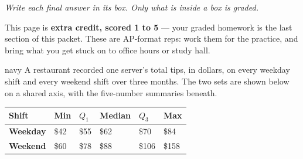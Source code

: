 \documentclass[12pt]{article}
\newcommand{\bxp}[7]{%
  \draw[thick, navy] (#3,#1) -- (#4,#1);
  \draw[thick, navy] (#6,#1) -- (#7,#1);
  \draw[thick, navy] (#3,{#1-#2}) -- (#3,{#1+#2});
  \draw[thick, navy] (#7,{#1-#2}) -- (#7,{#1+#2});
  \draw[thick, navy, fill=skymid] (#4,{#1-#2}) rectangle (#6,{#1+#2});
  \draw[very thick, navy] (#5,{#1-#2}) -- (#5,{#1+#2});}
\begin{document}
{\small\itshape Write each final answer in its box. Only what is inside a box is graded.}\par

\vspace{0.15in}

\boxguard[8]
\begin{remindbox}
\small
This page is \textbf{extra credit, scored 1 to 5} --- your graded homework is the last section
of this packet. These are AP-format reps: work them for the practice, and bring what you get
stuck on to office hours or study hall.
\end{remindbox}

\vspace{0.12in}

\boxguard[26]
\begin{scenariobox}{navy}
\small
A restaurant recorded one server's total tips, in dollars, on every weekday shift and every
weekend shift over three months. The two sets are shown below on a shared axis, with the
five-number summaries beneath.

\vspace{6pt}
\begin{center}
\end{center}
\vspace{4pt}

\renewcommand{\arraystretch}{1.2}
\begin{center}
\begin{tabularx}{0.88\linewidth}{@{} l Y Y Y Y Y @{}}
\textbf{Shift} & \textbf{Min} & \textbf{$Q_1$} & \textbf{Median} & \textbf{$Q_3$} &
\textbf{Max} \\
\hline
\textbf{Weekday} & \$42 & \$55 & \$62 & \$70 & \$84 \\
\textbf{Weekend} & \$60 & \$78 & \$88 & \$106 & \$158 \\
\end{tabularx}
\end{center}
\end{scenariobox}
\end{document}
